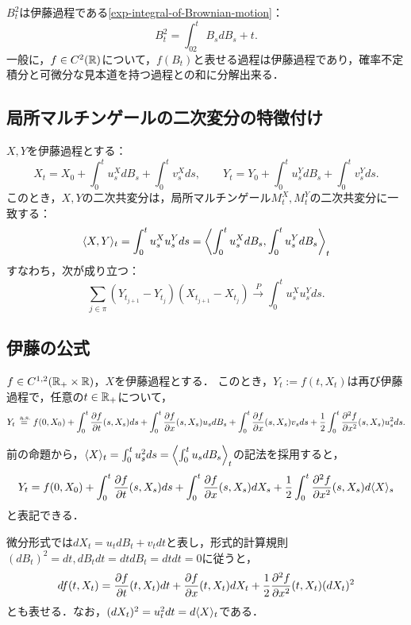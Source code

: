 \documentclass[uplatex,dvipdfmx]{jsreport}
\begin{document}
\begin{example}
    $B^2_t$は伊藤過程である\ref{exp-integral-of-Brownian-motion}：
    \[B^2_t=\int^t_02B_sdB_s+t.\]
    一般に，$f\in C^2(\mathbb{R})$について，$f(B_t)$と表せる過程は伊藤過程であり，確率不定積分と可微分な見本道を持つ過程との和に分解出来る．
\end{example}

\subsection{局所マルチンゲールの二次変分の特徴付け}

\begin{proposition}
    $X,Y$を伊藤過程とする：
    \[X_t=X_0+\int^t_0u^X_sdB_s+\int^t_0v_s^Xds,\qquad Y_t=Y_0+\int^t_0u_s^YdB_s+\int^t_0v_s^Yds.\]
    このとき，$X,Y$の二次共変分は，局所マルチンゲール$M_t^X,M_t^Y$の二次共変分に一致する：
    \[\langle X,Y\rangle_t=\int^t_0u_s^Xu_s^Yds=\left\langle\int^t_0u_s^XdB_s,\int^t_0u_s^YdB_s\right\rangle_t\]
    すなわち，次が成り立つ：
    \[\sum_{j\in\pi}(Y_{t_{j+1}}-Y_{t_j})(X_{t_{j+1}}-X_{t_j})\xrightarrow{P}\int^t_0u^X_su^Y_sds.\]
\end{proposition}

\subsection{伊藤の公式}

\begin{theorem}
    $f\in C^{1,2}(\mathbb{R}_+\times\mathbb{R})$，$X$を伊藤過程とする．
    このとき，$Y_t:=f(t,X_t)$は再び伊藤過程で，任意の$t\in\mathbb{R}_+$について，
    \[Y_t\overset{\;\mathrm{a.s.}}{=}f(0,X_0)+\int^t_0\frac{\partial f}{\partial t}(s,X_s)ds+\int^t_0\frac{\partial f}{\partial x}(s,X_s)u_sdB_s+\int^t_0\frac{\partial f}{\partial x}(s,X_s)v_sds+\frac{1}{2}\int^t_0\frac{\partial ^2f}{\partial x^2}(s,X_s)u_s^2ds.\]
\end{theorem}
\begin{remarks}
    前の命題から，$\langle X\rangle_t=\int^t_0u^2_sds=\left\langle\int^t_0u_sdB_s\right\rangle_t$の記法を採用すると，
    \[Y_t=f(0,X_0)+\int^t_0\frac{\partial f}{\partial t}(s,X_s)ds+\int^t_0\frac{\partial f}{\partial x}(s,X_s)dX_s+\frac{1}{2}\int^t_0\frac{\partial ^2f}{\partial x^2}(s,X_s)d\langle X\rangle_s\]
    と表記できる．
\end{remarks}
\begin{remarks}
    微分形式では$dX_t=u_tdB_t+v_tdt$と表し，形式的計算規則$(dB_t)^2=dt,dB_tdt=dtdB_t=dtdt=0$に従うと，
    \[df(t,X_t)=\frac{\partial f}{\partial t}(t,X_t)dt+\frac{\partial f}{\partial x}(t,X_t)dX_t+\frac{1}{2}\frac{\partial ^2f}{\partial x^2}(t,X_t)(dX_t)^2\]
    とも表せる．なお，$(dX_t)^2=u^2_tdt=d\langle X\rangle_t$である．
\end{remarks}
\end{document}
